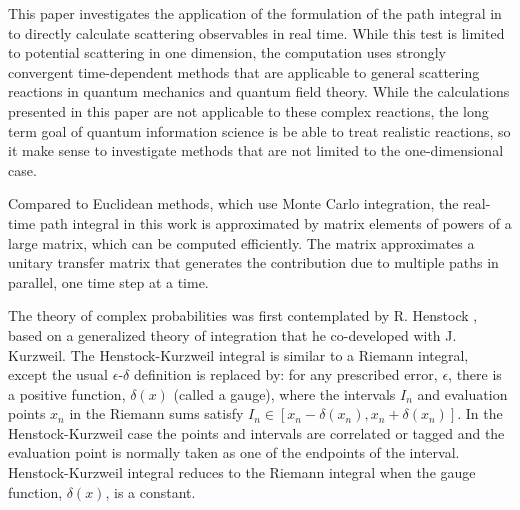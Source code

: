 \documentclass[aps,prc,reprint,noshowpacs,groupedaddress,onecolumn]{revtex4}
\begin{document}
This paper investigates the application of the formulation of the path
integral in \cite{Muldowney}\cite{Katya_1}\cite{Katya_2} to directly
calculate scattering observables in real time.  While this test is
limited to potential scattering in one dimension, the computation uses
strongly convergent time-dependent methods that are applicable to
general scattering reactions in quantum mechanics and quantum field
theory.  While the calculations presented in this paper are not
applicable to these complex reactions, the long term goal of quantum
information science is be able to treat realistic reactions, so it
make sense to investigate methods that are not limited to the one-dimensional
case.

Compared to Euclidean methods, which use Monte Carlo integration, the
real-time path integral in this work is approximated by matrix elements of
powers of a large matrix, which can be computed efficiently.
The matrix approximates a unitary transfer matrix that generates the
contribution due to multiple paths in parallel, one time step at a time.



The theory of complex probabilities was first contemplated by R.
Henstock \cite{Henstock}\cite{bartle}, based on a generalized theory
of integration that he co-developed with J. Kurzweil.  The
Henstock-Kurzweil integral is similar to a Riemann integral, except
the usual $\epsilon$-$\delta$ definition is replaced by: for any
prescribed error, $\epsilon$, there is a positive function,
$\delta (x)$ (called a gauge), where the intervals $I_n$ and
evaluation points $x_n$ in the Riemann sums satisfy
$I_n \in [x_n -\delta(x_n) , x_n+\delta (x_n)]$. In the
Henstock-Kurzweil case the points and intervals are correlated or
tagged and the evaluation point is normally taken as one of the
endpoints of the interval.  Henstock-Kurzweil integral reduces to the
Riemann integral when the gauge function, $\delta (x)$, is a constant.
 
\end{document}
